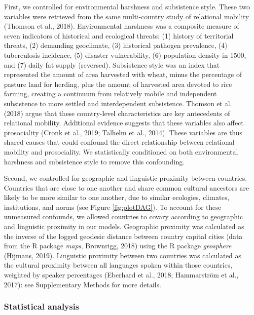 \documentclass[
  man,floatsintext]{apa6}
\begin{document}
First, we controlled for environmental harshness and subsistence style. These two variables were retrieved from the same multi-country study of relational mobility (Thomson et al., 2018). Environmental harshness was a composite measure of seven indicators of historical and ecological threats: (1) history of territorial threats, (2) demanding geoclimate, (3) historical pathogen prevalence, (4) tuberculosis incidence, (5) disaster vulnerability, (6) population density in 1500, and (7) daily fat supply (reversed). Subsistence style was an index that represented the amount of area harvested with wheat, minus the percentage of pasture land for herding, plus the amount of harvested area devoted to rice farming, creating a continuum from relatively mobile and independent subsistence to more settled and interdependent subsistence. Thomson et al. (2018) argue that these country-level characteristics are key antecedents of relational mobility. Additional evidence suggests that these variables also affect prosociality (Cronk et al., 2019; Talhelm et al., 2014). These variables are thus shared causes that could confound the direct relationship between relational mobility and prosociality. We statistically conditioned on both environmental harshness and subsistence style to remove this confounding.

Second, we controlled for geographic and linguistic proximity between countries. Countries that are close to one another and share common cultural ancestors are likely to be more similar to one another, due to similar ecologies, climates, institutions, and norms (see Figure \ref{fig:plotDAG}). To account for these unmeasured confounds, we allowed countries to covary according to geographic and linguistic proximity in our models. Geographic proximity was calculated as the inverse of the logged geodesic distance between country capital cities (data from the R package \emph{maps}, Brownrigg, 2018) using the R package \emph{geosphere} (Hijmans, 2019). Linguistic proximity between two countries was calculated as the cultural proximity between all languages spoken within those countries, weighted by speaker percentages (Eberhard et al., 2018; Hammarström et al., 2017): see Supplementary Methods for more details.

\hypertarget{statistical-analysis}{%
\subsubsection{Statistical analysis}\label{statistical-analysis}}
\end{document}
